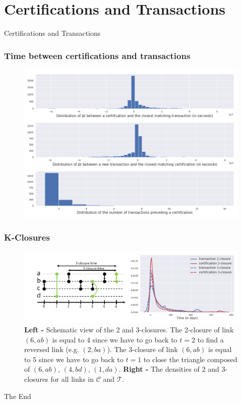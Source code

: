 \documentclass{beamer}
\begin{document}
\section{Certifications and Transactions}

\begin{frame}
	\Huge{\centerline{Certifications and Transactions}}
\end{frame}


\begin{frame}
	\frametitle{Time between certifications and transactions}
	\begin{figure}
		\includegraphics[width=.9\linewidth]{./figures/delta_t}
	\end{figure}
\end{frame}


\begin{frame}
	\frametitle{K-Closures}
	\begin{figure}
		\includegraphics[width=\linewidth]{./figures/triadic_closure}
		\caption{\textbf{Left -} Schematic view of the 2 and 3-closures. The 2-closure of link $\left(6, ab \right)$ is equal to 4 since we have to go back to $t = 2$ to find a reversed link (e.g. $\left(2, ba \right)$). The 3-closure of link $\left(6, ab \right)$ is equal to 5 since we have to go back to $t = 1$ to close the triangle composed of $\left(6, ab\right)$, $\left(4, bd \right)$, $\left(1, da\right)$. \textbf{Right -} The densities of 2 and 3-closures for all links in $\mathcal{C}$ and $\mathcal{T}$.}
	\end{figure}
\end{frame}



\begin{frame}
	\Huge{\centerline{The End}}
\end{frame}

\end{document}
